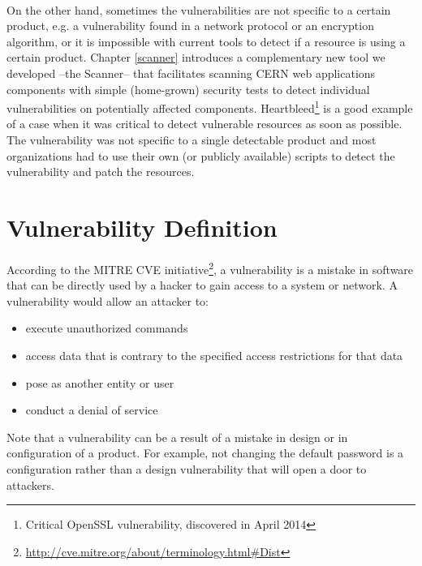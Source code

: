 \paragraph{}
On the other hand, sometimes the vulnerabilities are not specific to a certain product, e.g. a vulnerability found in a network protocol or an encryption algorithm, or it is impossible with current tools to detect if a resource is using a certain product. Chapter \ref{scanner} introduces a complementary new tool we developed --the Scanner-- that facilitates scanning CERN web applications components with simple (home-grown) security tests to detect individual vulnerabilities on potentially affected components. Heartbleed\footnote{Critical OpenSSL vulnerability, discovered in April 2014} is a good example of a case when it was critical to detect vulnerable resources as soon as possible. The vulnerability was not specific to a single detectable product and most organizations had to use their own (or publicly available) scripts to detect the vulnerability and patch the resources.

\section{Vulnerability Definition}
According to the MITRE CVE initiative\footnote{\url{http://cve.mitre.org/about/terminology.html\#Dist}}, a vulnerability is a mistake in software that can be directly used by a hacker to gain access to a system or network. A vulnerability would allow an attacker to:
\begin{itemize}
\item execute unauthorized commands
\item access data that is contrary to the specified access restrictions for that data
\item pose as another entity or user
\item conduct a denial of service
\end{itemize}

Note that a vulnerability can be a result of a mistake in design or in configuration of a product. For example, not changing the default password is a configuration rather than a design vulnerability that will open a door to attackers. 

